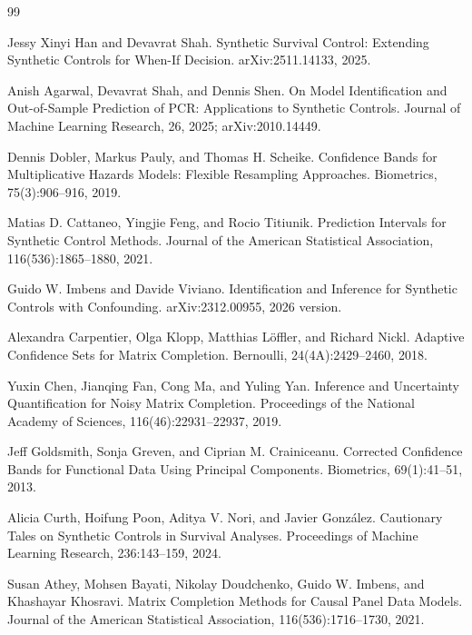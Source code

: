 \documentclass{article}
\begin{document}
\begin{thebibliography}{99}

   Jessy Xinyi Han and Devavrat Shah. Synthetic Survival Control: Extending Synthetic Controls for When-If Decision. arXiv:2511.14133, 2025.

   Anish Agarwal, Devavrat Shah, and Dennis Shen. On Model Identification and Out-of-Sample Prediction of PCR: Applications to Synthetic Controls. Journal of Machine Learning Research, 26, 2025; arXiv:2010.14449.

   Dennis Dobler, Markus Pauly, and Thomas H. Scheike. Confidence Bands for Multiplicative Hazards Models: Flexible Resampling Approaches. Biometrics, 75(3):906--916, 2019.

   Matias D. Cattaneo, Yingjie Feng, and Rocio Titiunik. Prediction Intervals for Synthetic Control Methods. Journal of the American Statistical Association, 116(536):1865--1880, 2021.

   Guido W. Imbens and Davide Viviano. Identification and Inference for Synthetic Controls with Confounding. arXiv:2312.00955, 2026 version.

   Alexandra Carpentier, Olga Klopp, Matthias Löffler, and Richard Nickl. Adaptive Confidence Sets for Matrix Completion. Bernoulli, 24(4A):2429--2460, 2018.

   Yuxin Chen, Jianqing Fan, Cong Ma, and Yuling Yan. Inference and Uncertainty Quantification for Noisy Matrix Completion. Proceedings of the National Academy of Sciences, 116(46):22931--22937, 2019.

   Jeff Goldsmith, Sonja Greven, and Ciprian M. Crainiceanu. Corrected Confidence Bands for Functional Data Using Principal Components. Biometrics, 69(1):41--51, 2013.

   Alicia Curth, Hoifung Poon, Aditya V. Nori, and Javier González. Cautionary Tales on Synthetic Controls in Survival Analyses. Proceedings of Machine Learning Research, 236:143--159, 2024.

   Susan Athey, Mohsen Bayati, Nikolay Doudchenko, Guido W. Imbens, and Khashayar Khosravi. Matrix Completion Methods for Causal Panel Data Models. Journal of the American Statistical Association, 116(536):1716--1730, 2021.


\end{thebibliography}
\end{document}
